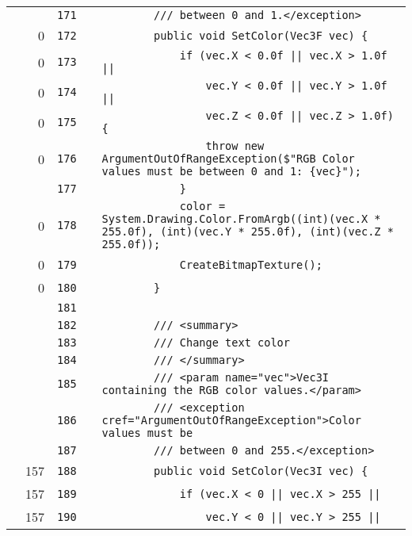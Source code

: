 \documentclass[a4paper,landscape,10pt]{article}
\begin{document}
\begin{longtable}[l]{lrrll}
\cellcolor{gray} &  & \verb~171~ & & \verb~        /// between 0 and 1.</exception>~\\
\cellcolor{red} & 0 & \verb~172~ & & \verb~        public void SetColor(Vec3F vec) {~\\
\cellcolor{red} & 0 & \verb~173~ & & \verb~            if (vec.X < 0.0f || vec.X > 1.0f ||~\\
\cellcolor{red} & 0 & \verb~174~ & & \verb~                vec.Y < 0.0f || vec.Y > 1.0f ||~\\
\cellcolor{red} & 0 & \verb~175~ & & \verb~                vec.Z < 0.0f || vec.Z > 1.0f) {~\\
\cellcolor{red} & 0 & \verb~176~ & & \verb~                throw new ArgumentOutOfRangeException($"RGB Color values must be between 0 and 1: {vec}");~\\
\cellcolor{gray} &  & \verb~177~ & & \verb~            }~\\
\cellcolor{red} & 0 & \verb~178~ & & \verb~            color = System.Drawing.Color.FromArgb((int)(vec.X * 255.0f), (int)(vec.Y * 255.0f), (int)(vec.Z * 255.0f));~\\
\cellcolor{red} & 0 & \verb~179~ & & \verb~            CreateBitmapTexture();~\\
\cellcolor{red} & 0 & \verb~180~ & & \verb~        }~\\
\cellcolor{gray} &  & \verb~181~ & & \verb~~\\
\cellcolor{gray} &  & \verb~182~ & & \verb~        /// <summary>~\\
\cellcolor{gray} &  & \verb~183~ & & \verb~        /// Change text color~\\
\cellcolor{gray} &  & \verb~184~ & & \verb~        /// </summary>~\\
\cellcolor{gray} &  & \verb~185~ & & \verb~        /// <param name="vec">Vec3I containing the RGB color values.</param>~\\
\cellcolor{gray} &  & \verb~186~ & & \verb~        /// <exception cref="ArgumentOutOfRangeException">Color values must be~\\
\cellcolor{gray} &  & \verb~187~ & & \verb~        /// between 0 and 255.</exception>~\\
\cellcolor{green} & 157 & \verb~188~ & & \verb~        public void SetColor(Vec3I vec) {~\\
\cellcolor{orange} & 157 & \verb~189~ & & \verb~            if (vec.X < 0 || vec.X > 255 ||~\\
\cellcolor{green} & 157 & \verb~190~ & & \verb~                vec.Y < 0 || vec.Y > 255 ||~\\

\end{longtable}
\end{document}
